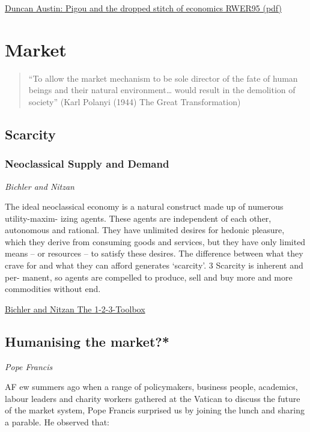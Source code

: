 \documentclass[
]{book}
\begin{document}
\href{pdf/Austin_2021_Pigou_\%20and_the_dropped_stitch_of_economics_RWER95.pdf}{Duncan Austin: Pigou and the dropped stitch of economics RWER95 (pdf)}

\hypertarget{market}{%
\chapter{Market}\label{market}}

\begin{quote}
``To allow the market mechanism to be sole director of the fate of human
beings and their natural environment\ldots{} would result in the demolition of
society'' (Karl Polanyi (1944) The Great Transformation)
\end{quote}

\hypertarget{scarcity}{%
\section{Scarcity}\label{scarcity}}

\hypertarget{neoclassical-supply-and-demand}{%
\subsection{Neoclassical Supply and Demand}\label{neoclassical-supply-and-demand}}

\emph{Bichler and Nitzan}

The ideal neoclassical economy is a natural construct made up of numerous utility-maxim-
izing agents. These agents are independent of each other, autonomous and rational. They have
unlimited desires for hedonic pleasure, which they derive from consuming goods and services,
but they have only limited means -- or resources -- to satisfy these desires. The difference between
what they crave for and what they can afford generates `scarcity'. 3 Scarcity is inherent and per-
manent, so agents are compelled to produce, sell and buy more and more commodities without
end.

\href{Bichler_Nitzan_The_1_2_3_Toolbox.pdf}{Bichler and Nitzan The 1-2-3-Toolbox}

\hypertarget{humanising-the-market}{%
\section{Humanising the market?*}\label{humanising-the-market}}

\emph{Pope Francis}

AF ew summers ago when a range of policymakers, business people, academics, labour leaders and charity workers gathered at the Vatican to discuss the future of the market system, Pope Francis surprised us by joining the lunch and sharing a parable. He observed that:
\end{document}
